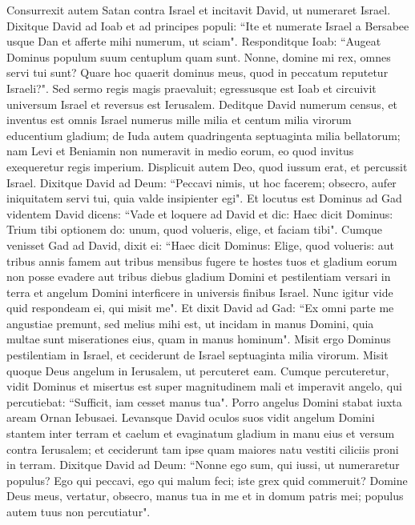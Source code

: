 \begin{biblechapter}  
\verse Consurrexit autem Satan contra Israel et incitavit David, ut numeraret Israel. 
\verse Dixitque David ad Ioab et ad principes populi: “Ite et numerate Israel a Bersabee usque Dan et afferte mihi numerum, ut sciam". 
\verse Responditque Ioab: “Augeat Dominus populum suum centuplum quam sunt. Nonne, domine mi rex, omnes servi tui sunt? Quare hoc quaerit dominus meus, quod in peccatum reputetur Israeli?". 
\verse Sed sermo regis magis praevaluit; egressusque est Ioab et circuivit universum Israel et reversus est Ierusalem. 
\verse Deditque David numerum census, et inventus est omnis Israel numerus mille milia et centum milia virorum educentium gladium; de Iuda autem quadringenta septuaginta milia bellatorum; 
\verse nam Levi et Beniamin non numeravit in medio eorum, eo quod invitus exequeretur regis imperium. 
\verse Displicuit autem Deo, quod iussum erat, et percussit Israel. 
\verse Dixitque David ad Deum: “Peccavi nimis, ut hoc facerem; obsecro, aufer iniquitatem servi tui, quia valde insipienter egi". 
\verse Et locutus est Dominus ad Gad videntem David dicens: 
\verse “Vade et loquere ad David et dic: Haec dicit Dominus: Trium tibi optionem do: unum, quod volueris, elige, et faciam tibi". 
\verse Cumque venisset Gad ad David, dixit ei: “Haec dicit Dominus: Elige, quod volueris: 
\verse aut tribus annis famem aut tribus mensibus fugere te hostes tuos et gladium eorum non posse evadere aut tribus diebus gladium Domini et pestilentiam versari in terra et angelum Domini interficere in universis finibus Israel. Nunc igitur vide quid respondeam ei, qui misit me". 
\verse Et dixit David ad Gad: “Ex omni parte me angustiae premunt, sed melius mihi est, ut incidam in manus Domini, quia multae sunt miserationes eius, quam in manus hominum". 
\verse Misit ergo Dominus pestilentiam in Israel, et ceciderunt de Israel septuaginta milia virorum. 
\verse Misit quoque Deus angelum in Ierusalem, ut percuteret eam. Cumque percuteretur, vidit Dominus et misertus est super magnitudinem mali et imperavit angelo, qui percutiebat: “Sufficit, iam cesset manus tua". Porro angelus Domini stabat iuxta aream Ornan Iebusaei. 
\verse Levansque David oculos suos vidit angelum Domini stantem inter terram et caelum et evaginatum gladium in manu eius et versum contra Ierusalem; et ceciderunt tam ipse quam maiores natu vestiti ciliciis proni in terram. 
\verse Dixitque David ad Deum: “Nonne ego sum, qui iussi, ut numeraretur populus? Ego qui peccavi, ego qui malum feci; iste grex quid commeruit? Domine Deus meus, vertatur, obsecro, manus tua in me et in domum patris mei; populus autem tuus non percutiatur". 

\end{biblechapter}
